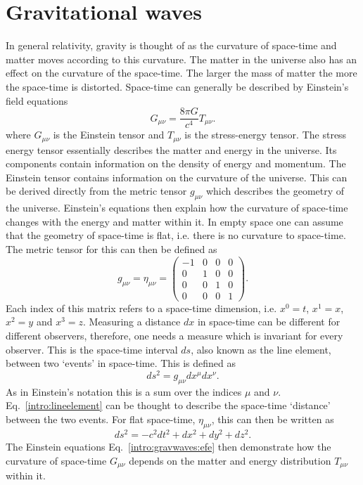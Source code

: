\section{\label{intro:gravwaves}Gravitational waves}

In general relativity, gravity is thought of as the curvature of space-time and matter moves according to this curvature. 
The matter in the universe also has an effect on the curvature of the space-time.
The larger the mass of matter the more the space-time is distorted.
Space-time can generally be described by Einstein's field equations
\begin{equation}
\label{intro:gravwaves:efe}
    G_{\mu \nu} = \frac{8 \pi G}{c^4}T_{\mu \nu}.
\end{equation}
where $G_{\mu \nu}$ is the Einstein tensor and $T_{\mu \nu}$ is the stress-energy tensor.
The stress energy tensor essentially describes the matter and energy in the universe. Its components contain information on the density of energy and momentum.
The Einstein tensor contains information on the curvature of the universe. 
This can be derived directly from the metric tensor $g_{\mu \nu}$ which describes the geometry of the universe.
Einstein's equations then explain how the curvature of space-time changes with the energy and matter within it. 
In empty space one can assume that the geometry of space-time is flat, i.e. there is no curvature to space-time. The metric tensor for this can then be defined as
\begin{equation}
g_{\mu \nu} = \eta_{\mu \nu} = \left(
\begin{matrix}
-1 & 0 & 0 & 0 \\
0 & 1 & 0 & 0 \\
0 & 0 & 1 & 0 \\
0 & 0 & 0 & 1 
\end{matrix}
\right).
\end{equation}
Each index of this matrix refers to a space-time dimension, i.e. $x^0 = t$, $x^1=x$, $x^2=y$ and $x^3=z$. 
Measuring a distance $dx$ in space-time can be different for different observers, therefore, one needs a measure which is invariant for every observer. 
This is the space-time interval $ds$, also known as the line element, between two `events' in space-time. 
This is defined as
\begin{equation}
\label{intro:lineelement}
    ds^2 = g_{\mu \nu} dx^{\mu}dx^{\nu}.
\end{equation}
As in Einstein's notation this is a sum over the indices $\mu$ and $\nu$.  
Eq.~\ref{intro:lineelement} can be thought to describe the space-time `distance' between the two events.
For flat space-time, $\eta_{\mu\nu}$, this can then be written as
\begin{equation}
    ds^2 = -c^2 dt^2 + dx^2 + dy^2 + dz^2.
\end{equation}
The Einstein equations Eq.~\ref{intro:gravwaves:efe} then demonstrate how the curvature of space-time $G_{\mu\nu}$ depends on the matter and energy distribution $T_{\mu \nu}$ within it.

